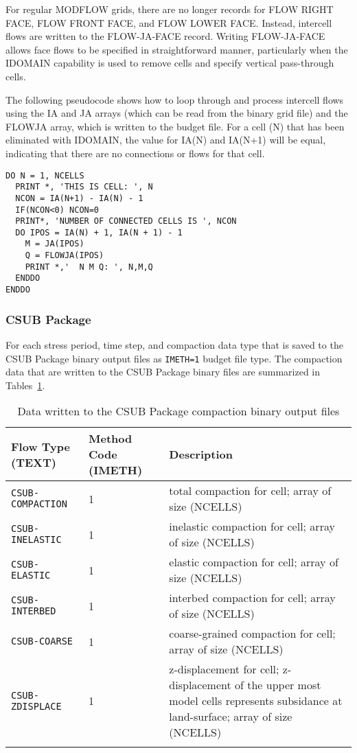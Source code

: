 For regular MODFLOW grids, there are no longer records for FLOW RIGHT FACE, FLOW FRONT FACE,  and FLOW LOWER FACE.  Instead, intercell flows are written to the FLOW-JA-FACE record.  Writing FLOW-JA-FACE allows face flows to be specified in straightforward manner, particularly when the IDOMAIN capability is used to remove cells and specify vertical pass-through cells.  

The following pseudocode shows how to loop through and process intercell flows using the IA and JA arrays (which can be read from the binary grid file) and the FLOWJA array, which is written to the budget file.  For a cell (N) that has been eliminated with IDOMAIN, the value for IA(N) and IA(N+1) will be equal, indicating that there are no connections or flows for that cell.

\begin{verbatim}
DO N = 1, NCELLS
  PRINT *, 'THIS IS CELL: ', N
  NCON = IA(N+1) - IA(N) - 1
  IF(NCON<0) NCON=0
  PRINT*, 'NUMBER OF CONNECTED CELLS IS ', NCON
  DO IPOS = IA(N) + 1, IA(N + 1) - 1
    M = JA(IPOS)
    Q = FLOWJA(IPOS)
    PRINT *,'  N M Q: ', N,M,Q
  ENDDO
ENDDO
\end{verbatim}
 
\newpage
\subsubsection{CSUB Package}

\vspace{5mm}
For each stress period, time step, and compaction data type that is saved to the CSUB Package binary output files as \texttt{IMETH=1} budget file type. The compaction data that are written to the CSUB Package binary files are summarized in Tables~\ref{table:binarycsub}.

\begin{longtable}{p{3.5cm} p{2cm} p{9cm}}
	\caption{Data written to the CSUB Package compaction binary output files} 
	\tabularnewline
		\hline
		\textbf{Flow Type (TEXT)} & \textbf{Method Code (IMETH)} & \textbf{Description} \\
		\hline
	\endhead
		\hline
	\endfoot
	\texttt{CSUB-COMPACTION} & 1 & total compaction for cell; array of size (NCELLS) \\
	\texttt{CSUB-INELASTIC} & 1 & inelastic compaction for cell; array of size (NCELLS) \\
	\texttt{CSUB-ELASTIC} & 1 & elastic compaction for cell; array of size (NCELLS) \\
	\texttt{CSUB-INTERBED} & 1 & interbed compaction for cell; array of size (NCELLS) \\
	\texttt{CSUB-COARSE} & 1 & coarse-grained compaction for cell; array of size (NCELLS) \\
	\texttt{CSUB-ZDISPLACE} & 1 & z-displacement for cell; z-displacement of the upper most model cells represents subsidance at land-surface; array of size (NCELLS) \\
	\label{table:binarycsub}
\end{longtable}

